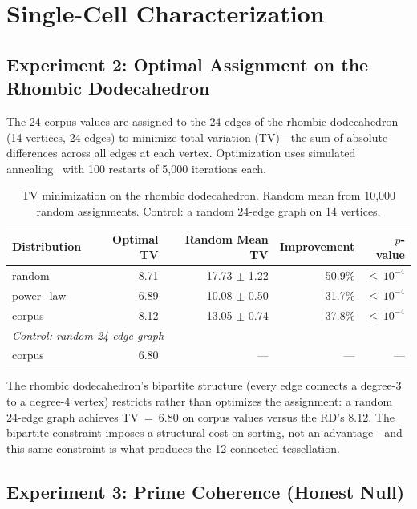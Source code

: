 \documentclass[11pt]{article}
\begin{document}
\section{Single-Cell Characterization}
\label{sec:cell}

\subsection{Experiment 2: Optimal Assignment on the Rhombic Dodecahedron}

The 24 corpus values are assigned to the 24 edges of the rhombic
dodecahedron (14 vertices, 24 edges) to minimize total variation
(TV)---the sum of absolute differences across all edges at each
vertex. Optimization uses simulated
annealing~\cite{kirkpatrick1983} with 100 restarts of 5{,}000
iterations each.

\begin{table}[H]
\centering
\caption{TV minimization on the rhombic dodecahedron. Random mean
  from 10{,}000 random assignments. Control: a random 24-edge graph
  on 14 vertices.}
\label{tab:exp2}
\begin{tabular}{lrrrr}
\toprule
Distribution & Optimal TV & Random Mean TV & Improvement & $p$-value \\
\midrule
random    & 8.71 & 17.73 $\pm$ 1.22 & 50.9\% & ${\leq}\,10^{-4}$ \\
power\_law & 6.89 & 10.08 $\pm$ 0.50 & 31.7\% & ${\leq}\,10^{-4}$ \\
corpus    & 8.12 & 13.05 $\pm$ 0.74 & 37.8\% & ${\leq}\,10^{-4}$ \\
\midrule
\multicolumn{5}{l}{\textit{Control: random 24-edge graph}} \\
corpus    & 6.80 & --- & --- & --- \\
\bottomrule
\end{tabular}
\end{table}

The rhombic dodecahedron's bipartite structure (every edge connects
a degree-3 to a degree-4 vertex) restricts rather than optimizes the
assignment: a random 24-edge graph achieves TV~=~6.80 on corpus
values versus the RD's 8.12. The bipartite constraint imposes a
structural cost on sorting, not an advantage---and this same
constraint is what produces the 12-connected tessellation.

\subsection{Experiment 3: Prime Coherence (Honest Null)}
\end{document}
